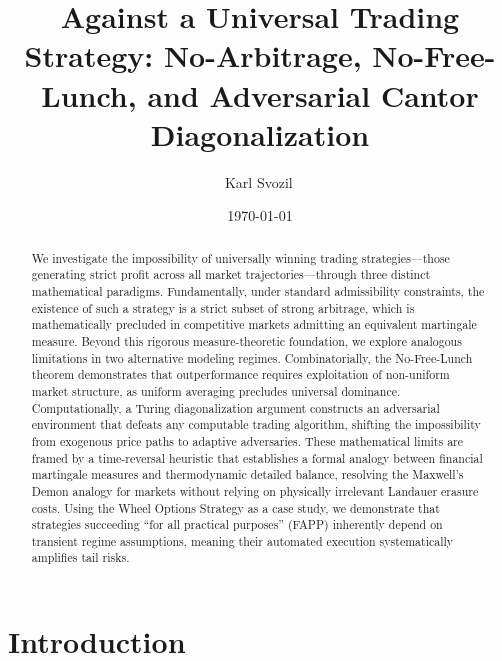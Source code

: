 \documentclass[aps,pra,reprint,superscriptaddress,amsmath,amssymb]{revtex4-2}
\theoremstyle{plain}
\theoremstyle{definition}
\theoremstyle{remark}
\begin{document}
\title{Against a Universal Trading Strategy: No-Arbitrage, No-Free-Lunch, and Adversarial Cantor Diagonalization}

\author{Karl Svozil\,}

\date{\today}

\begin{abstract}
We investigate the impossibility of universally winning trading strategies---those generating strict profit across all market trajectories---through three distinct mathematical paradigms. Fundamentally, under standard admissibility constraints, the existence of such a strategy is a strict subset of strong arbitrage, which is mathematically precluded in competitive markets admitting an equivalent martingale measure. Beyond this rigorous measure-theoretic foundation, we explore analogous limitations in two alternative modeling regimes. Combinatorially, the No-Free-Lunch theorem demonstrates that outperformance requires exploitation of non-uniform market structure, as uniform averaging precludes universal dominance. Computationally, a Turing diagonalization argument constructs an adversarial environment that defeats any computable trading algorithm, shifting the impossibility from exogenous price paths to adaptive adversaries. These mathematical limits are framed by a time-reversal heuristic that establishes a formal analogy between financial martingale measures and thermodynamic detailed balance, resolving the Maxwell's Demon analogy for markets without relying on physically irrelevant Landauer erasure costs. Using the Wheel Options Strategy as a case study, we demonstrate that strategies succeeding ``for all practical purposes'' (FAPP) inherently depend on transient regime assumptions, meaning their automated execution systematically amplifies tail risks.
\end{abstract}

\maketitle

\section{Introduction}
\label{sec:intro}
\end{document}
